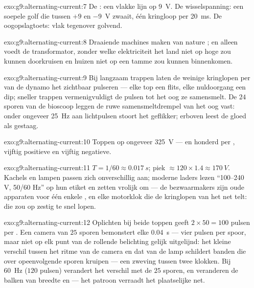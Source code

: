 \begin{solution}{exo:g9:alternating-current:7}
De : een vlakke lijn op \qty{9}{V}. De wisselspanning:
een soepele golf die tussen $+9$ en \qty{-9}{V} zwaait, één kringloop
per \qty{20}{ms}. De oogopslagtoets: vlak tegenover golvend.
\end{solution}

\begin{solution}{exo:g9:alternating-current:8}
Draaiende machines maken van nature ; en alleen
 voedt de transformator, zonder welke elektriciteit het
land niet op hoge  zou kunnen doorkruisen en huizen niet
op een tamme zou kunnen binnenkomen.
\end{solution}

\begin{solution}{exo:g9:alternating-current:9}
Bij langzaam trappen laten de weinige kringlopen per  van de
dynamo het  zichtbaar pulseren --- elke top een flits, elke
nuldoorgang een dip; sneller trappen vermenigvuldigt de pulsen tot het
oog ze samensmelt. De $24$ sporen van de bioscoop leggen de ruwe
samensmeltdrempel van het oog vast: onder ongeveer \qty{25}{Hz} aan
lichtpulsen stoort het geflikker; erboven leest de gloed als gestaag.
\end{solution}

\begin{solution}{exo:g9:alternating-current:10}
Toppen op ongeveer \qty{325}{V} --- en honderd per , vijftig
positieve en vijftig negatieve.
\end{solution}

\begin{solution}{exo:g9:alternating-current:11}
$T = 1/60 \approx \qty{0.017}{s}$; piek $\approx 120 \times 1.4 \approx
\qty{170}{V}$. Kachels en lampen passen zich onverschillig aan; moderne
laders lezen ``100--240 V, 50/60 Hz'' op hun etiket en zetten vrolijk
om --- de bezwaarmakers zijn oude apparaten voor één enkele
, en elke motorklok die de kringlopen van het net
telt: die zou op zestig te snel lopen.
\end{solution}

\begin{solution}{exo:g9:alternating-current:12}
Oplichten bij beide toppen geeft $2 \times 50 = 100$ pulsen per
. Een camera van $25$ sporen bemonstert elke \qty{0.04}{s} ---
vier pulsen per spoor, maar niet op elk punt van de rollende belichting
gelijk uitgelijnd: het kleine verschil tussen het ritme van de camera
en dat van de lamp schildert banden die over opeenvolgende sporen
kruipen --- een zweving tussen twee klokken. Bij \qty{60}{Hz} ($120$
pulsen) verandert het verschil met de $25$ sporen, en veranderen de
balken van breedte en  --- het patroon verraadt het
plaatselijke net.
\end{solution}

